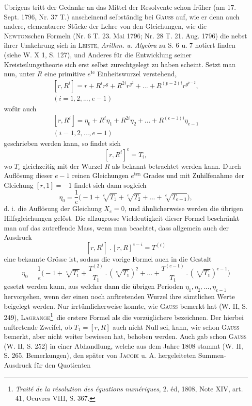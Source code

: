 Übrigens tritt der Gedanke an das Mittel der Resolvente schon früher (am 17. Sept. 1796, Nr. 37 T.) anscheinend selbständig bei \textsc{Gauss} auf, wie er denn auch andere, elementarere Stücke der Lehre von den Gleichungen, wie die \textsc{Newton}schen Formeln (Nr. 6 T. 23. Mai 1796; Nr. 28 T. 21. Aug. 1796) die nebst ihrer Umkehrung sich in \textsc{Leiste}, \textit{Arithm. u. Algebra} zu S. 6 u. 7 notiert finden (siehe W. X 1, S. 127), und Anderes für die Entwicklung seiner Kreisteilungstheorie sich erst selbst zurechtgelegt zu haben scheint. Setzt man nun, unter \(R\) eine primitive \(e^{\mathrm{te}}\) Einheitswurzel verstehend,
\[
\begin{gathered}
[r,R^i]=r+R^i r^g+R^{2i}r^{g^2}+\ldots+R^{(p-2)i}r^{g^{p-2}},\\
(i=1,2,\ldots,e-1)
\end{gathered}
\]
wofür auch
\[
\begin{gathered}
[r,R^i]=\eta_0+R^i\eta_1+R^{2i}\eta_2+\ldots+R^{(e-1)i}\eta_{e-1}\\
(i=1,2,\ldots,e-1)
\end{gathered}
\]
geschrieben werden kann, so findet sich
\[
[r,R^i]^e=T_i,
\]
\newpage{}
\noindent wo \(T_i\) gleichzeitig mit der Wurzel \(R\) als bekannt betrachtet werden kann. Durch Auflösung dieser \(e-1\) reinen Gleichungen \(e^{\mathrm{ten}}\) Grades und mit Zuhilfenahme der Gleichung \([r,1]=-1\) findet sich dann sogleich
\[
\eta_0=\frac1e\bigl(-1+\sqrt[e]{T_1}+\sqrt[e]{T_2}+\ldots+\sqrt[e]{T_{e-1}}\bigr),
\]
d. i. die Auflösung der Gleichung \(X_e=0\), und ähnlicherweise werden die übrigen Hilfsgleichungen gelöst. Die allzugrosse Vieldeutigkeit dieser Formel beschränkt man auf das zutreffende Mass, wenn man beachtet, dass allgemein auch der Ausdruck
\[
[r,R^i]\mathbin{.}[r,R]^{e-i}=T^{(i)}
\]
eine bekannte Grösse ist, sodass die vorige Formel auch in die Gestalt
\[
\eta_0=\frac1e\biggl(-1+\sqrt[e]{T_1}+\frac{T^{(2)}}{T_1}\mathbin{.}(\sqrt[e]{T_1})^2+\ldots+\frac{T^{(e-1)}}{T_1}\mathbin{.}(\sqrt[e]{T_1})^{e-1}\biggr)
\]
gesetzt werden kann, aus welcher dann die übrigen Perioden \(\eta_1,\eta_2,\ldots,\eta_{e-1}\) hervorgehen, wenn der einen noch auftretenden Wurzel ihre sämtlichen Werte beigelegt werden. Nur irrtümlicherweise konnte, wie \textsc{Gauss} bemerkt hat (W. II, S. 249), \textsc{Lagrange}\footnote{\textit{Traité de la résolution des équations numériques}, 2. éd, 1808, Note XIV, art. 41, Oeuvres VIII, S. 367.}\ die erstere Formel als die vorzüglichere bezeichnen. Der hierbei auftretende Zweifel, ob \(T_1=[r,R]\) auch nicht Null sei, kann, wie schon \textsc{Gauss} bemerkt, aber nicht weiter bewiesen hat, behoben werden. Auch gab schon \textsc{Gauss} (W. II, S. 252) in einer Abhandlung, welche aus dem Jahre 1808 stammt (W. II, S. 265, Bemerkungen), den später von \textsc{Jacobi} u. A. hergeleiteten Summen-Ausdruck für den Quotienten
